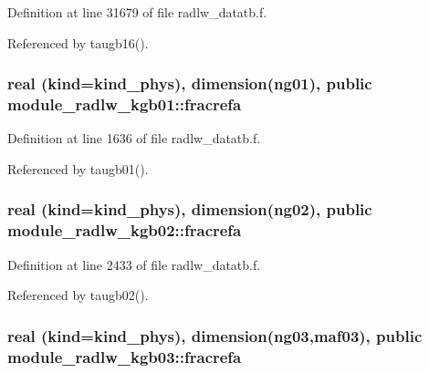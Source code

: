 Definition at line 31679 of file radlw\+\_\+datatb.\+f.



Referenced by taugb16().

\subsubsection[{\texorpdfstring{fracrefa}{fracrefa}}]{\setlength{\rightskip}{0pt plus 5cm}real (kind=kind\+\_\+phys), dimension(ng01), public module\+\_\+radlw\+\_\+kgb01\+::fracrefa}\hypertarget{group__module__radlw__main_ga0bca660247ac37483cd55c6936056631}{}\label{group__module__radlw__main_ga0bca660247ac37483cd55c6936056631}


Definition at line 1636 of file radlw\+\_\+datatb.\+f.



Referenced by taugb01().

\subsubsection[{\texorpdfstring{fracrefa}{fracrefa}}]{\setlength{\rightskip}{0pt plus 5cm}real (kind=kind\+\_\+phys), dimension(ng02), public module\+\_\+radlw\+\_\+kgb02\+::fracrefa}\hypertarget{group__module__radlw__main_gaf6db1580bd4a8b037cdd3e14765e2c83}{}\label{group__module__radlw__main_gaf6db1580bd4a8b037cdd3e14765e2c83}


Definition at line 2433 of file radlw\+\_\+datatb.\+f.



Referenced by taugb02().

\subsubsection[{\texorpdfstring{fracrefa}{fracrefa}}]{\setlength{\rightskip}{0pt plus 5cm}real (kind=kind\+\_\+phys), dimension(ng03,maf03), public module\+\_\+radlw\+\_\+kgb03\+::fracrefa}\hypertarget{group__module__radlw__main_ga26e901a002e789933c5c9b622f3a0932}{}\label{group__module__radlw__main_ga26e901a002e789933c5c9b622f3a0932}


